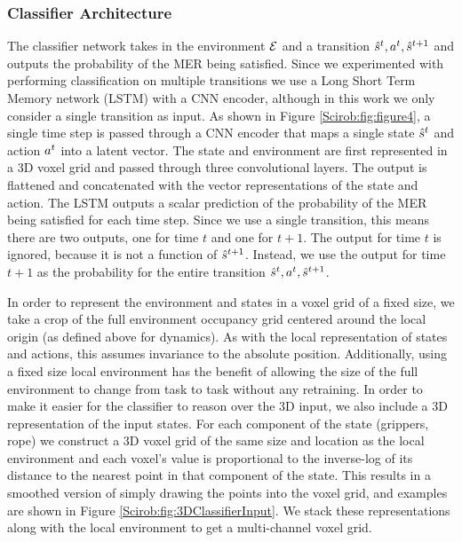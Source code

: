 \subsubsection{Classifier Architecture}

The classifier network takes in the environment $\mathcal{E}$ and a transition $\hat{s}^{t},a^{t},\hat{s}^{t+1}$ and outputs the probability of the MER being satisfied. Since we experimented with performing classification on multiple transitions we use a Long Short Term Memory network (LSTM) with a CNN encoder, although in this work we only consider a single transition as input. As shown in Figure \ref{Scirob:fig:figure4}, a single time step is passed through a CNN encoder that maps a single state $\hat{s}^{t}$ and action $a^{t}$ into a latent vector. The state and environment are first represented in a 3D voxel grid and passed through three convolutional layers. The output is flattened and concatenated with the vector representations of the state and action. The LSTM outputs a scalar prediction of the probability of the MER being satisfied for each time step. Since we use a single transition, this means there are two outputs, one for time $t$ and one for $t+1$. The output for time $t$ is ignored, because it is not a function of $\hat{s}^{t+1}$. Instead, we use the output for time $t+1$ as the probability for the entire transition $\hat{s}^{t},a^{t},\hat{s}^{t+1}$.

\label{Scirob:sec:voxels}
In order to represent the environment and states in a voxel grid of a fixed size, we take a crop of the full environment occupancy grid centered around the local origin (as defined above for dynamics). As with the local representation of states and actions, this assumes invariance to the absolute position. Additionally, using a fixed size local environment has the benefit of allowing the size of the full environment to change from task to task without any retraining. In order to make it easier for the classifier to reason over the 3D input, we also include a 3D representation of the input states. For each component of the state (grippers, rope) we construct a 3D voxel grid of the same size and location as the local environment and each voxel's value is proportional to the inverse-log of its distance to the nearest point in that component of the state. This results in a smoothed version of simply drawing the points into the voxel grid, and examples are shown in Figure \ref{Scirob:fig:3DClassifierInput}. We stack these representations along with the local environment to get a multi-channel voxel grid.


